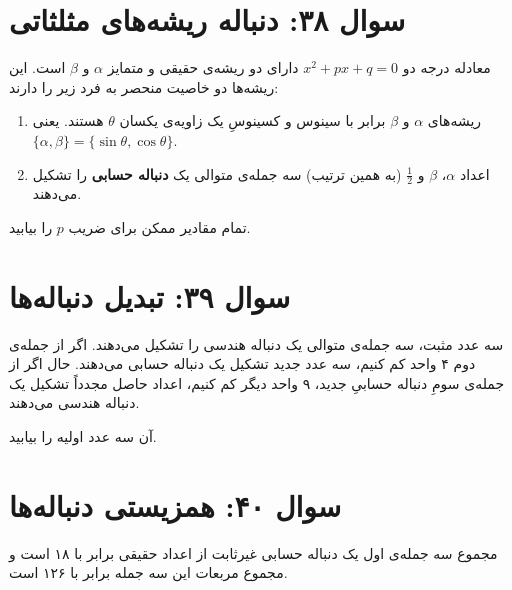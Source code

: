 \documentclass[12pt]{article}
\begin{document}
	
	\section*{سوال ۳۸: دنباله ریشه‌های مثلثاتی}
	معادله درجه دو \( x^2 + px + q = 0 \) دارای دو ریشه‌ی حقیقی و متمایز \(\alpha\) و \(\beta\) است. این ریشه‌ها دو خاصیت منحصر به فرد زیر را دارند:
	\begin{enumerate}[label=(\roman*)]
		\item ریشه‌های \(\alpha\) و \(\beta\) برابر با سینوس و کسینوسِ یک زاویه‌ی یکسان \(\theta\) هستند. یعنی \( \{\alpha, \beta\} = \{\sin\theta, \cos\theta\} \).
		\item اعداد \(\alpha\)، \(\beta\) و \(\frac{1}{2}\) (به همین ترتیب) سه جمله‌ی متوالی یک \textbf{دنباله حسابی} را تشکیل می‌دهند.
	\end{enumerate}
	\vspace{0.5cm}
	
	تمام مقادیر ممکن برای ضریب \(p\) را بیابید.
	
	\vspace{1cm}
	\hrulefill
	\vspace{1cm}
	
	\section*{سوال ۳۹: تبدیل دنباله‌ها}
	سه عدد مثبت، سه جمله‌ی متوالی یک دنباله هندسی را تشکیل می‌دهند. اگر از جمله‌ی دوم ۴ واحد کم کنیم، سه عدد جدید تشکیل یک دنباله حسابی می‌دهند. حال اگر از جمله‌ی سومِ دنباله حسابیِ جدید، ۹ واحد دیگر کم کنیم، اعداد حاصل مجدداً تشکیل یک دنباله هندسی می‌دهند.
	\vspace{0.5cm}
	
	آن سه عدد اولیه را بیابید.
	
	\vspace{1cm}
	\hrulefill
	\vspace{1cm}
	
	\section*{سوال ۴۰: همزیستی دنباله‌ها }
	مجموع سه جمله‌ی اول یک دنباله حسابی غیرثابت از اعداد حقیقی برابر با ۱۸ است و مجموع مربعات این سه جمله برابر با ۱۲۶ است.
	\vspace{0.5cm}
	
\end{document}
